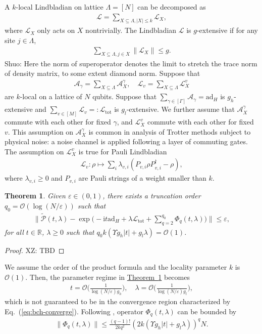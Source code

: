 \documentclass[11pt]{article}
\newtheorem{theorem}{Theorem}
\newcommand{\eq}[1]{(\ref{eq:#1})}
\newcommand{\thm}[1]{\hyperref[thm:#1]{Theorem~\ref*{thm:#1}}}
\renewcommand{\i}{\mathrm{i}}
\renewcommand{\L}{\mathcal{L}}
\newcommand{\ad}{\mathrm{ad}}
\newcommand{\B}{\Big}
\renewcommand{\P}{\mathcal{P}}
\newcommand{\A}{\mathcal{A}}
\renewcommand{\O}{\mathcal{O}}
\newcommand{\tot}{\mathrm{tot}}
\newcommand{\xz}[1]{{\color{cyan} XZ: #1}}
\newcommand{\sz}[1]{{\color{blue} Shuo: #1}}
\begin{document}
A $k$-local Lindbladian on lattice $\Lambda=[N]$ can be decomposed as  \begin{align*}
    \L=\sum_{X\subseteq \Lambda, |X|\le k } \L_X,
\end{align*}
where $\L_X$ only acts on $X$ nontrivially. The Lindbladian $\L$ is $g$-extensive if for any site $j\in \Lambda$, \begin{align*}
    \sum_{X\subseteq \Lambda, j\in X}\|\L_X\|\le g.
\end{align*} 
\sz{Here the norm of superoperator denotes the limit to stretch the trace norm of density matrix, to some extent diamond norm.} Suppose that \begin{align*}
    \A_\gamma = \sum_{X\subseteq \Lambda} \mathcal{A}_{X}^{\gamma}, \quad \L_v=\sum_{X\subseteq \Lambda} \L^{v}_X
\end{align*}
are $k$-local on a lattice of $N$ qubits. Suppose that $\sum_{\gamma\in[\Gamma]}\A_\gamma=\ad_H$ is $g_h$-extensive and $\sum_{v\in [M]}\L_v=:\L_{\tot}$ is $g_l$-extensive. We further assume that $\A_X^{\gamma}$ commute with each other for fixed $\gamma$, and $\L_{X}^{v}$ commute with each other for fixed $v$. This assumption on $\A_X^{\gamma}$ is common in analysis of Trotter methods subject to physical noise: a noise channel is applied following a layer of commuting gates. The assumption on $\L_X^{v}$ is true for Pauli Lindbladian \begin{align*}
    \L_v\colon\rho\mapsto \sum_{i} \lambda_{v,i} (P_{v,i} \rho P_{v,i}^{\dagger}-\rho),
\end{align*}
where $\lambda_{v,i}\ge 0$ and $P_{v,i}$ are Pauli strings of a weight smaller than $k$. 
\begin{theorem}
\label{thm:bch-approx}
    Given $\varepsilon\in (0,1)$, there exists a truncation order $q_0 = \O(\log(N/\varepsilon))$ such that \begin{align*}
        \Bigg\|\tilde{\P}(t,\lambda)-\exp\bigg( -\i t \ad_H+\lambda\L_{\tot}+\sum_{q=2}^{q_0} \Phi_q(t, \lambda) \bigg)\Bigg\|\le \varepsilon,
    \end{align*}
    for all $t\in \mathbb{R}$, $\lambda\ge0$ such that $q_0 k(\Upsilon g_h|t|+g_l \lambda) = \O(1)$.
\end{theorem}
\begin{proof} 
    \xz{TBD}
\end{proof}
We assume the order of the product formula and the locality parameter $k$ is $\O(1)$. Then, the parameter regime in \thm{bch-approx} becomes \begin{align}
    t= \O\B(\frac{1}{\log(N/\varepsilon) g_h}\B), \quad \lambda = \O\B(\frac{1}{\log(N/\varepsilon) g_l}\B), 
\end{align}
which is not guaranteed to be in the convergence region characterized by Eq.~\eq{bch-converge}. Following \cite{aftab2024multi, mizuta2025commutator}, operator $\Phi_q(t,\lambda)$ can be bounded by \begin{align}
    \|\Phi_q(t,\lambda)\|\le \frac{(q-1)!}{2kq^2} (2k(\Upsilon g_h |t| + g_l \lambda))^{q}N. 
\end{align}
\end{document}
